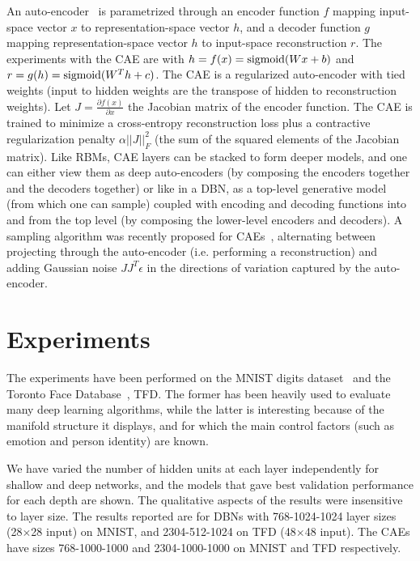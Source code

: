 An auto-encoder~\citep{Lecun-these87,hinton1994amd} is parametrized
through an encoder function $f$ mapping input-space vector $x$ to
representation-space vector $h$, and a decoder function $g$ mapping
representation-space vector $h$ to input-space reconstruction $r$. The
experiments with the CAE are with $h=f(x)=\mathrm{sigmoid}(W x + b)$ and
$r=g(h)=\mathrm{sigmoid}(W^T h + c)$.  The CAE is a regularized auto-encoder with
tied weights (input to hidden weights are the transpose of hidden to
reconstruction weights). Let  $J=\frac{\partial f(x)}{\partial x}$ 
the Jacobian matrix of the encoder function. 
The CAE is trained to minimize a cross-entropy reconstruction
loss plus a contractive regularization penalty
$\alpha ||J||^2_F$ (the sum of the
squared elements of the Jacobian matrix). Like RBMs, CAE layers can be stacked to
form deeper models, and one can either view them as deep auto-encoders (by
composing the encoders together and the decoders together) or like in a
DBN, as a top-level generative model (from which one can sample) coupled with encoding
and decoding functions into and from the top level (by composing the lower-level
encoders and decoders).  A sampling algorithm was recently proposed for
CAEs~\citep{Rifai-icml2012},  alternating between projecting
through the auto-encoder (i.e. performing a reconstruction) and adding
Gaussian noise $J J^T \epsilon$ in the directions of variation captured by the auto-encoder.

\vspace*{-1.5mm}
\section{Experiments}
\vspace*{-1mm}

The experiments have been performed on the MNIST digits
dataset~\citep{LeCun98} and the Toronto Face
Database~\citep{Susskind2010}, TFD. The former has been heavily used to evaluate
many deep learning algorithms, while the latter is interesting because of
the manifold structure it displays, and for which the main control factors (such as
emotion and person identity) are known.

We have varied the number of hidden units at each layer independently for
shallow and deep networks, and the models that gave best validation
performance for each depth are shown. The qualitative aspects of the
results were insensitive to layer size.  The results reported are for DBNs with
768-1024-1024 layer sizes (28$\times$28 input) on MNIST, and 2304-512-1024 on TFD
(48$\times$48 input). The CAEs have sizes 768-1000-1000 and 2304-1000-1000
on MNIST and TFD respectively.


